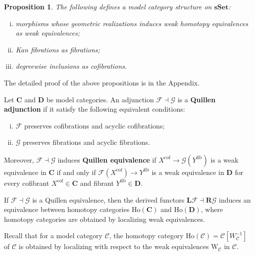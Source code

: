 \documentclass[psamsfonts]{amsart}
\newtheorem{prop}{Proposition}[section]
\theoremstyle{definition}
\newcommand{\sSet}{\mathbf{sSet}}
\newcommand{\Ho}{\mathrm{Ho}}
\newcommand{\W}{\mathrm{W}}
\numberwithin{equation}{section}
\begin{document}
\begin{prop}
The following defines a model category structure on $\sSet$:
\begin{enumerate}[(i)]
    \item morphisms whose geometric realizations induces weak homotopy equivalences as weak equivalences;
    \item Kan fibrations as fibrations;
    \item degreewise inclusions as cofibrations.
\end{enumerate}
\end{prop}

The detailed proof of the above propositions is in the Appendix.

\begin{defns}
Let $\mathbf{C}$ and $\mathbf{D}$ be model categories. An adjunction $\mathcal{F}\dashv\mathcal{G}$ is a \textbf{Quillen adjunction} if it satisfy the following equivalent conditions:\begin{enumerate}[(i)]
    \item $\mathcal{F}$ preserves cofibrations and acyclic cofibrations;
    \item $\mathcal{G}$ preserves fibrations and acyclic fibrations.
\end{enumerate}
Moreover, $\mathcal{F}\dashv\mathcal{G}$ induces \textbf{Quillen equivalence} if $X^{\textrm{cof}}\to\mathcal{G}(Y^{\textrm{fib}})$ is a weak equivalence in $\mathbf{C}$ if and only if $\mathcal{F}(X^{\textrm{cof}})\to Y^{\textrm{fib}}$ is a weak equivalence in $\mathbf{D}$ for every cofibrant $X^{\textrm{cof}}\in\mathbf{C}$ and fibrant $Y^{\textrm{fib}}\in\mathbf{D}$.
\end{defns}

If $\mathcal{F}\dashv\mathcal{G}$ is a Quillen equivalence, then the derived functors $\mathbf{L}\mathcal{F}\dashv\mathbf{R}\mathcal{G}$ induces an equivalence between homotopy categories $\Ho(\mathbf{C})$ and $\Ho(\mathbf{D})$, where homotopy categories are obtained by localizing weak equivalences.

Recall that for a model category $\mathcal{C}$, the homotopy category $\Ho(\mathcal{C})=\mathcal{C}[W_\mathcal{C}^{-1}]$ of $\mathcal{C}$ is obtained by localizing with respect to the weak equivalences $\W_\mathcal{C}$ in $\mathcal{C}$.
\end{document}
